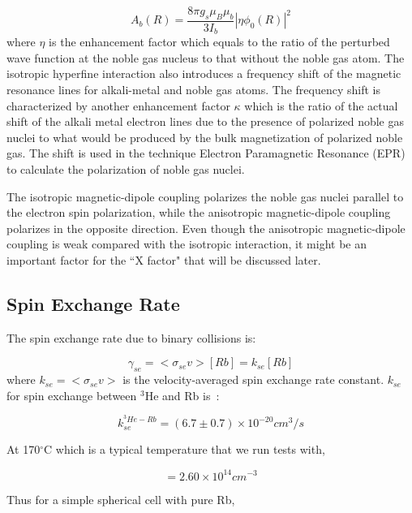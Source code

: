 \begin{equation}
A_{b}(R)=\frac{8\pi g_{s}\mu_{B}\mu_{b}}{3I_{b}}|\eta \phi_{0}(R)|^{2}
\end{equation}
where $\eta$ is the enhancement factor which equals to the ratio of the perturbed wave function at the noble gas nucleus to that without the noble gas atom. The isotropic hyperfine interaction also introduces a frequency shift of the magnetic resonance lines for alkali-metal and noble gas atoms. The frequency shift is characterized by another enhancement factor $\kappa$ which is the ratio of the actual shift of the alkali metal electron lines due to the presence of polarized noble gas nuclei to what would be produced by the bulk magnetization of polarized noble gas. The shift is used in the technique Electron Paramagnetic Resonance (EPR) to calculate the polarization of noble gas nuclei.

The isotropic magnetic-dipole coupling polarizes the noble gas nuclei parallel to the electron spin polarization, while the anisotropic magnetic-dipole coupling polarizes in the opposite direction. Even though the anisotropic magnetic-dipole coupling is weak compared with the isotropic interaction, it might be an important factor for the ``X factor" that will be discussed later.

\subsection{Spin Exchange Rate}

The spin exchange rate due to binary collisions is:

\begin{equation}
\gamma_{se}=<\sigma_{se}v>[Rb]=k_{se}[Rb]
\end{equation}
where $k_{se}=<\sigma_{se}v>$ is the velocity-averaged spin exchange rate constant. $k_{se}$ for spin exchange between $^{3}$He and Rb is~\cite{PhysRevLett.80.2801}:

\begin{equation}
k_{se}^{^{3}He-Rb}=(6.7\pm 0.7)\times 10^{-20}cm^{3}/s
\end{equation}

At 170$^{\circ}$C which is a typical temperature that we run tests with,

\begin{equation}
[Rb]=2.60\times 10^{14}cm^{-3}
\end{equation}

Thus for a simple spherical cell with pure Rb,

